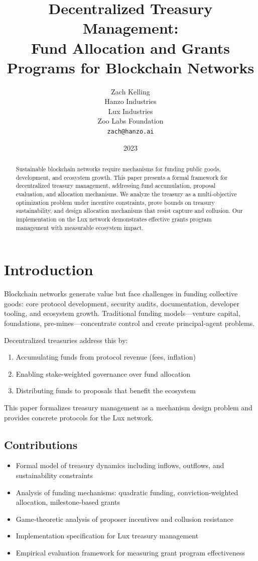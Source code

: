 \documentclass[11pt,a4paper]{article}
\title{Decentralized Treasury Management:\\
Fund Allocation and Grants Programs for Blockchain Networks}
\author{Zach Kelling\\
Hanzo Industries\\
Lux Industries\\
Zoo Labs Foundation\\
\texttt{zach@hanzo.ai}}
\date{2023}
\begin{document}
\maketitle

\begin{abstract}
Sustainable blockchain networks require mechanisms for funding public goods, development, and ecosystem growth. This paper presents a formal framework for decentralized treasury management, addressing fund accumulation, proposal evaluation, and allocation mechanisms. We analyze the treasury as a multi-objective optimization problem under incentive constraints, prove bounds on treasury sustainability, and design allocation mechanisms that resist capture and collusion. Our implementation on the Lux network demonstrates effective grants program management with measurable ecosystem impact.
\end{abstract}

\section{Introduction}

Blockchain networks generate value but face challenges in funding collective goods: core protocol development, security audits, documentation, developer tooling, and ecosystem growth. Traditional funding models---venture capital, foundations, pre-mines---concentrate control and create principal-agent problems.

Decentralized treasuries address this by:
\begin{enumerate}
    \item Accumulating funds from protocol revenue (fees, inflation)
    \item Enabling stake-weighted governance over fund allocation
    \item Distributing funds to proposals that benefit the ecosystem
\end{enumerate}

This paper formalizes treasury management as a mechanism design problem and provides concrete protocols for the Lux network.

\subsection{Contributions}

\begin{itemize}
    \item Formal model of treasury dynamics including inflows, outflows, and sustainability constraints
    \item Analysis of funding mechanisms: quadratic funding, conviction-weighted allocation, milestone-based grants
    \item Game-theoretic analysis of proposer incentives and collusion resistance
    \item Implementation specification for Lux treasury management
    \item Empirical evaluation framework for measuring grant program effectiveness
\end{itemize}
\end{document}
